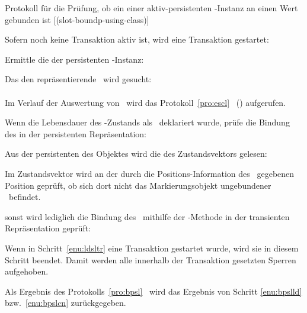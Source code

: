 %
%
\begin{infol}
%
\acaption%
 {{Protokoll f\"{u}r die Pr\"{u}fung, ob ein \protect\Slt\/ einer
   aktiv-persistenten \clos-Instanz an einen Wert gebunden ist}}%
 [(slot-boundp-using-class)]\label{pro:bpsl}%
%
\item\label{enu:bpsltr} Sofern noch keine Transaktion aktiv ist, wird
eine Transaktion gestartet:\\
%
\item Ermittle die \sobjid\/ der persistenten \clos-Instanz:\\
%
\item Das den \Slt\/ repr\"{a}sentierende \sltdo\ wird gesucht:\\
\\
Im Verlauf der Auswertung von
\ wird das
Protokoll~\ref{pro:escl}
\stfn{\enscldescr}\ (\citepage{\pageref{pro:escl}}) aufgerufen.
%
\item Wenn die Lebensdauer des \Slt\/-Zustands als
\ deklariert wurde, pr\"{u}fe die Bindung
des \Slt[s]\/ in der persistenten Repr\"{a}sentation:
%
\begin{block}
%
\item Aus der persistenten \representation{} des Objektes wird die
\sobjid\/ des Zustandsvektors gelesen:\\
%
\item\label{enu:bpslld} Im Zustandsvektor wird an der durch
die Po\-si\-tions-In\-for\-ma\-tion des \sltdo[es]\ gegebenen Position
gepr\"{u}ft, ob sich dort nicht das Markierungsobjekt \rglq{}ungebundener
\Slt\rgrq\ befindet.
%
\end{block}
%
\item\label{enu:bpslcn} sonst wird lediglich die Bindung des \Slt[s]\
mithilfe der \std-Methode in der transienten Repr\"{a}sentation
gepr\"{u}ft:\\
%
\item Wenn in Schritt~\ref{enu:ldsltr} eine Transaktion gestartet
wurde, wird sie in diesem Schritt beendet. Damit werden alle innerhalb
der Transaktion gesetzten Sperren aufgehoben.
%
\item Als Ergebnis des Protokolls~\ref{pro:bpsl}
\ wird das Ergebnis von
Schritt \ref{enu:bpslld} bzw.\ \ref{enu:bpslcn} zur\"{u}ckgegeben.
%
\end{infol}
%
%
%

